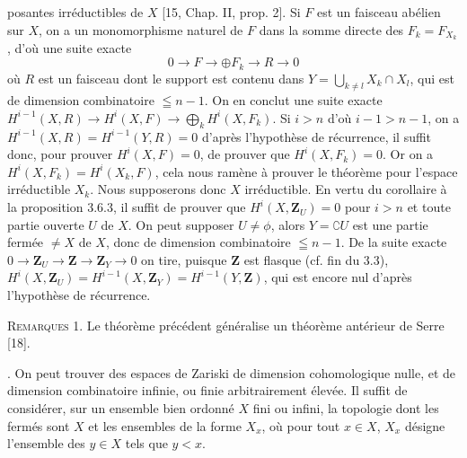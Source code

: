 
\noindent posantes irréductibles de $X$ [15, Chap. II, prop. 2]. Si $F$ est un faisceau
abélien sur $X$, on a un monomorphisme naturel de $F$ dans la somme directe
des $F_k=F_{X_k}$, d'où une suite exacte
\[
0\to F\to\oplus F_k\to R
\to0
\]
où $R$ est un faisceau dont le support est contenu dans
$Y=\displaystyle\bigcup\limits_{k\ne l}X_k\cap X_l$,
qui est de dimension combinatoire $\leqq n-1$. On en conclut une suite exacte
$H^{i-1}(X,R)\to H^i(X,F)\to\displaystyle\bigoplus\limits_k H^i(X,F_k)$.
Si $i>n$ d'où $i-1>n-1$, on a
$H^{i-1}(X,R)=H^{i-1}(Y,R)=0$ d'après l'hypothèse de récurrence, il suffit
donc, pour prouver $H^i(X,F)=0$, de prouver que $H^i(X,F_k)=0$. Or on a
$H^i(X,F_k)=H^i(X_k,F)$,
cela nous ramène à prouver le théorème pour l'espace irréductible $X_k$. Nous
supposerons donc $X$ irréductible. En vertu du corollaire à la proposition
3.6.3, il suffit de prouver que $H^i(X,\mathbf Z_U)=0$ pour $i>n$ et toute partie
ouverte $U$ de $X$. On peut supposer $U\ne\phi$, alors $Y=\complement U$ est
une partie fermée $\ne X$ de $X$, donc de dimension combinatoire
$\leqq n-1$. De la suite exacte
$0\to \mathbf Z_U\to \mathbf Z\to \mathbf Z_Y\to0$
on tire, puisque $\mathbf Z$ est flasque (cf. fin du 3.3),
$H^i(X,\mathbf Z_U)=H^{i-1}(X,\mathbf Z_Y)=H^{i-1}(Y,\mathbf Z)$,
qui est encore nul d'après l'hypothèse de récurrence.

\indent\textsc{Remarques} 1. Le théorème précédent généralise un théorème
antérieur de Serre [18].

. On peut trouver des espaces de Zariski de dimension cohomologique
nulle, et de dimension combinatoire infinie, ou finie arbitrairement élevée.
Il suffit de considérer, sur un ensemble bien ordonné $X$ fini ou infini, la
topologie dont les fermés sont $X$ et les ensembles de la forme $X_x$, où pour tout
$x\in X$, $X_x$ désigne l'ensemble des $y\in X$ tels que $y<x$.

